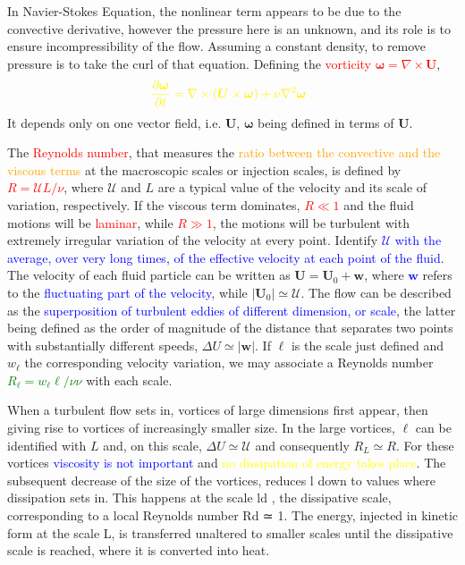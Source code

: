 \documentclass[12pt,a4paper]{article}
\renewcommand{\vec}[1]{\boldsymbol{#1}}
\begin{document}
In Navier-Stokes Equation, the nonlinear term appears to be due to the convective derivative, however the pressure here is an unknown, and its role is to ensure incompressibility of the flow. Assuming a constant density, to remove pressure is to take the curl of that equation. Defining the \textcolor{red}{vorticity $\vec{\omega} = \nabla \times \vec{U}$},
\begin{equation}
\color{yellow} \frac{\partial \vec{\omega}}{\partial t} = \nabla \times (\vec{U} \times \vec{\omega}) +\nu \nabla^2 \vec{\omega} ~.
\end{equation}
It depends only on one vector field, i.e. $\vec{U}$, $\vec{\omega}$ being defined in terms of $\vec{U}$. 

The \textcolor{red}{Reynolds number}, that measures the \textcolor{orange}{ratio between the convective and the viscous terms} at the macroscopic scales or injection scales, is defined by \textcolor{red}{$R = \mathcal U L/\nu$}, where $\mathcal U$ and  $L$ are a typical value of the velocity and its scale of variation, respectively. If the viscous term dominates, \textcolor{red}{$R \ll 1$} and the fluid motions will be \textcolor{red}{laminar}, while \textcolor{red}{$R \gg 1$}, the motions will be turbulent with extremely irregular variation of the velocity at every point. Identify \textcolor{blue}{$\mathcal U$ with the average, over very long times, of the effective velocity at each point of the fluid}. The velocity of each fluid particle can be written as $\vec{U} = \vec{U}_0 + \vec{w}$, where \textcolor{blue}{$\vec{w}$} refers to the \textcolor{blue}{fluctuating part of the velocity}, while $|\vec{U}_0 | \simeq \mathcal U$. The flow can be described as the \textcolor{blue}{superposition of turbulent eddies of different dimension, or scale}, the latter being defined as the order of magnitude of the distance that separates two points with substantially different speeds, $\Delta U \simeq |\vec{w}|$. If $\ell$ is the scale just defined and $w_\ell$ the corresponding velocity variation, we may associate a Reynolds number \textcolor{green}{$R_\ell = w_\ell \ell/ν\nu$} with each scale.

When a turbulent flow sets in, vortices of large dimensions first appear, then giving rise to vortices of increasingly smaller size. In the large vortices, $\ell$ can be identified with $L$ and, on this scale, $\Delta U \simeq \mathcal U$ and consequently $R_L \simeq R$. For these vortices \textcolor{blue}{viscosity is not important} and \textcolor{yellow}{no dissipation of energy takes place}. The subsequent decrease of the size of the vortices, reduces l down to values where dissipation sets in. This happens at the scale ld , the dissipative scale, corresponding to a local Reynolds number Rd ≃ 1. The energy, injected in kinetic form at the scale L, is transferred unaltered to smaller scales until the dissipative scale is reached, where it is converted into heat.
\end{document}

